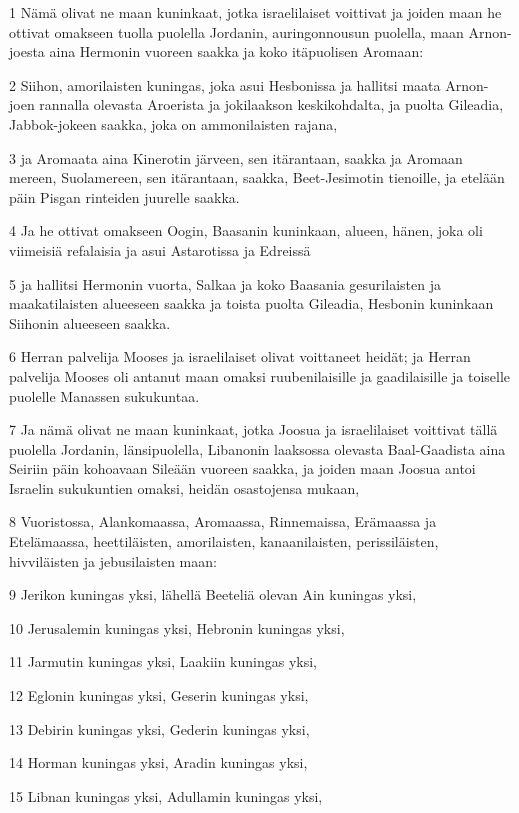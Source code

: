 \par 1 Nämä olivat ne maan kuninkaat, jotka israelilaiset voittivat ja joiden maan he ottivat omakseen tuolla puolella Jordanin, auringonnousun puolella, maan Arnon-joesta aina Hermonin vuoreen saakka ja koko itäpuolisen Aromaan:
\par 2 Siihon, amorilaisten kuningas, joka asui Hesbonissa ja hallitsi maata Arnon-joen rannalla olevasta Aroerista ja jokilaakson keskikohdalta, ja puolta Gileadia, Jabbok-jokeen saakka, joka on ammonilaisten rajana,
\par 3 ja Aromaata aina Kinerotin järveen, sen itärantaan, saakka ja Aromaan mereen, Suolamereen, sen itärantaan, saakka, Beet-Jesimotin tienoille, ja etelään päin Pisgan rinteiden juurelle saakka.
\par 4 Ja he ottivat omakseen Oogin, Baasanin kuninkaan, alueen, hänen, joka oli viimeisiä refalaisia ja asui Astarotissa ja Edreissä
\par 5 ja hallitsi Hermonin vuorta, Salkaa ja koko Baasania gesurilaisten ja maakatilaisten alueeseen saakka ja toista puolta Gileadia, Hesbonin kuninkaan Siihonin alueeseen saakka.
\par 6 Herran palvelija Mooses ja israelilaiset olivat voittaneet heidät; ja Herran palvelija Mooses oli antanut maan omaksi ruubenilaisille ja gaadilaisille ja toiselle puolelle Manassen sukukuntaa.
\par 7 Ja nämä olivat ne maan kuninkaat, jotka Joosua ja israelilaiset voittivat tällä puolella Jordanin, länsipuolella, Libanonin laaksossa olevasta Baal-Gaadista aina Seiriin päin kohoavaan Sileään vuoreen saakka, ja joiden maan Joosua antoi Israelin sukukuntien omaksi, heidän osastojensa mukaan,
\par 8 Vuoristossa, Alankomaassa, Aromaassa, Rinnemaissa, Erämaassa ja Etelämaassa, heettiläisten, amorilaisten, kanaanilaisten, perissiläisten, hivviläisten ja jebusilaisten maan:
\par 9 Jerikon kuningas yksi, lähellä Beeteliä olevan Ain kuningas yksi,
\par 10 Jerusalemin kuningas yksi, Hebronin kuningas yksi,
\par 11 Jarmutin kuningas yksi, Laakiin kuningas yksi,
\par 12 Eglonin kuningas yksi, Geserin kuningas yksi,
\par 13 Debirin kuningas yksi, Gederin kuningas yksi,
\par 14 Horman kuningas yksi, Aradin kuningas yksi,
\par 15 Libnan kuningas yksi, Adullamin kuningas yksi,

